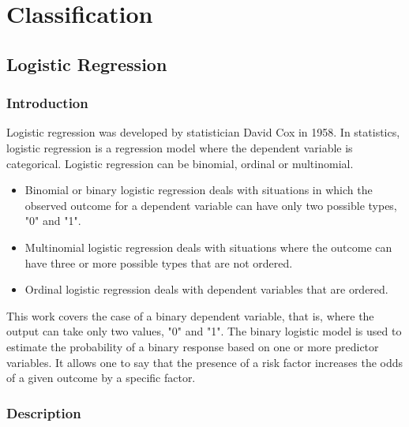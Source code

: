 \chapter{Classification}




\section{Logistic Regression}

\subsection{Introduction}

Logistic regression was developed by statistician David Cox in 1958. In statistics, logistic regression is a regression model where the dependent variable is categorical. Logistic regression can be binomial, ordinal or multinomial.
\begin{itemize}
	\item Binomial or binary logistic regression deals with situations in which the observed outcome for a dependent variable can have only two possible types, "0" and "1". 
	\item Multinomial logistic regression deals with situations where the outcome can have three or more possible types that are not ordered. 
	\item Ordinal logistic regression deals with dependent variables that are ordered.
\end{itemize}
This work covers the case of a binary dependent variable, that is, where the output can take only two values, "0" and "1". The binary logistic model is used to estimate the probability of a binary response based on one or more predictor variables. It allows one to say that the presence of a risk factor increases the odds of a given outcome by a specific factor.


\subsection{Description}

